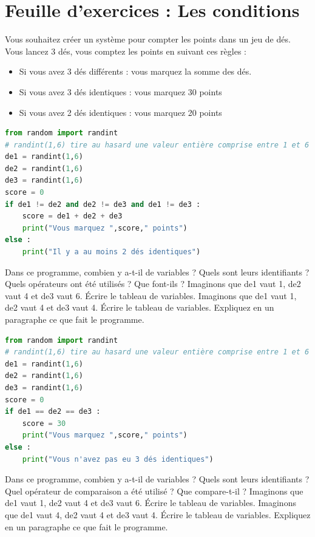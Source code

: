 \setcounter{Exercise}{0}

\chapter*{Feuille d'exercices : Les conditions}

Vous souhaitez créer un système pour compter les points dans un jeu de dés. Vous lancez 3 dés, vous comptez les points en suivant ces règles :
\begin{itemize}
\item Si vous avez 3 dés différents : vous marquez la somme des dés.
\item Si vous avez 3 dés identiques : vous marquez 30 points
\item Si vous avez 2 dés identiques : vous marquez 20 points
\end{itemize}
\begin{Exercise}[title={Test des dés différents}]
\begin{lstlisting}[style=pythonstyle, language=Python]
from random import randint
# randint(1,6) tire au hasard une valeur entière comprise entre 1 et 6
de1 = randint(1,6)
de2 = randint(1,6)
de3 = randint(1,6)
score = 0
if de1 != de2 and de2 != de3 and de1 != de3 :
    score = de1 + de2 + de3
    print("Vous marquez ",score," points")
else :
    print("Il y a au moins 2 dés identiques")
\end{lstlisting}
\Question Dans ce programme, combien y a-t-il de variables ? Quels sont leurs identifiants ?
\Question Quels opérateurs ont été utilisés ? Que font-ils ?
\Question Imaginons que de1 vaut 1, de2 vaut 4 et de3 vaut 6. Écrire le tableau de variables.
\Question Imaginons que de1 vaut 1, de2 vaut 4 et de3 vaut 4. Écrire le tableau de variables.
\Question Expliquez en un paragraphe ce que fait le programme.
\end{Exercise}

\newpage
% 
\begin{Exercise}[title={Test des 3 dés identiques}]
\begin{lstlisting}[style=pythonstyle, language=Python]
from random import randint
# randint(1,6) tire au hasard une valeur entière comprise entre 1 et 6
de1 = randint(1,6)
de2 = randint(1,6)
de3 = randint(1,6)
score = 0
if de1 == de2 == de3 :
    score = 30
    print("Vous marquez ",score," points")
else :
    print("Vous n'avez pas eu 3 dés identiques")
\end{lstlisting}
\Question Dans ce programme, combien y a-t-il de variables ? Quels sont leurs identifiants ?
\Question Quel opérateur de comparaison a été utilisé ? Que compare-t-il ?
\Question Imaginons que de1 vaut 1, de2 vaut 4 et de3 vaut 6. Écrire le tableau de variables.
\Question Imaginons que de1 vaut 4, de2 vaut 4 et de3 vaut 4. Écrire le tableau de variables.
\Question Expliquez en un paragraphe ce que fait le programme.
\end{Exercise}


